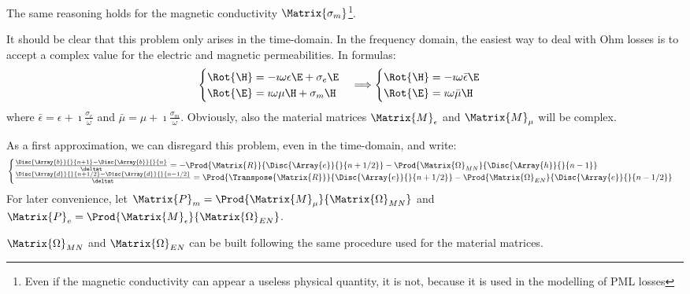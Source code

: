 The same reasoning holds for the magnetic conductivity
$\Matrix{\sigma_m}$\footnote{Even if the magnetic conductivity can
  appear a useless physical quantity, it is not, because it is used in
  the modelling of PML losses}.

It should be clear that this problem only arises in the
time-domain. In the frequency domain, the easiest way to deal with Ohm
losses is to accept a complex value for the electric and magnetic
permeabilities. In formulas:
\begin{equation*}
    \begin{cases}
      \Rot{\H} = -\imath \omega \epsilon \E + \sigma_e \E \\
      \Rot{\E} = \imath \omega \mu \H + \sigma_m \H \\
    \end{cases}
    \Longrightarrow
    \begin{cases}
      \Rot{\H} = -\imath \omega \bar{\epsilon} \E \\
      \Rot{\E} = \imath \omega \bar{\mu} \H \\
    \end{cases}
\end{equation*}
where $\bar{\epsilon} = \epsilon + \imath \frac{\sigma_e}{\omega}$ and
$\bar{\mu} = \mu + \imath \frac{\sigma_m}{\omega}$. Obviously, also
the material matrices $\Matrix{M}_\epsilon$ and $\Matrix{M}_\mu$ will
be complex.

As a first approximation, we can disregard this problem, even in the
time-domain, and write: 
\begin{equation*} \begin{cases}
    \frac{\Disc{\Array{b}}{}{n+1} - \Disc{\Array{b}}{}{n}}{\deltat} = -
    \Prod{\Matrix{R}}{\Disc{\Array{e}}{}{n+1/2}} -
    \Prod{\Matrix{\Omega}_{MN}}{\Disc{\Array{h}}{}{n-1}} \\
    \frac{\Disc{\Array{d}}{}{n+1/2} - \Disc{\Array{d}}{}{n-1/2}}{\deltat} = 
    \Prod{\Transpose{\Matrix{R}}}{\Disc{\Array{e}}{}{n+1/2}} -
    \Prod{\Matrix{\Omega}_{EN}}{\Disc{\Array{e}}{}{n-1/2}}
\end{cases} \end{equation*}
For later convenience, let $\Matrix{P}_m =
\Prod{\Matrix{M}_\mu}{\Matrix{\Omega}_{MN}}$ and $\Matrix{P}_e =
\Prod{\Matrix{M}_\epsilon}{\Matrix{\Omega}_{EN}}$.

$\Matrix{\Omega}_{MN}$ and $\Matrix{\Omega}_{EN}$ can be built
following the same procedure used for the material matrices.

